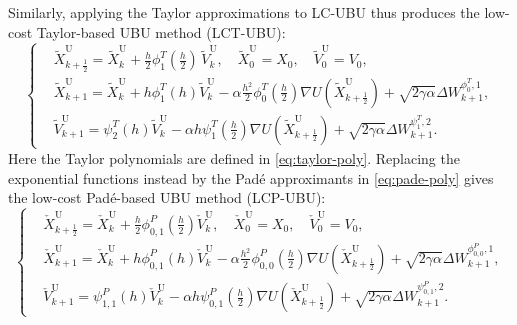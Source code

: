 \documentclass[12pt]{article}
\numberwithin{equation}{section}
\newcommand{\U}{\nabla U}
\begin{document}

Similarly, applying the Taylor approximations 
to LC-UBU thus produces the low-cost
Taylor-based UBU method (LCT-UBU):
\begin{equation}
\label{eq:LCT-UBU}
\left\{
\begin{aligned}
& \widetilde{X}^{\mathrm{U}}_{k+\frac{1}{2}}
=
\widetilde{X}^{\mathrm{U}}_k
+
\tfrac{h}{2} \phi^T_1(\tfrac{h}{2}) \, \widetilde{V}^{\mathrm{U}}_k,
\quad 
\widetilde{X}^{\mathrm{U}}_{0}
=
X_0,
\quad 
\widetilde{V}^{\mathrm{U}}_{0}
=
V_0,
\\
&
\widetilde{X}^{\mathrm{U}}_{k+1}
=
\widetilde{X}^{\mathrm{U}}_k
+
h\phi^T_1(h)\widetilde{V}^{\mathrm{U}}_k
-
\alpha \tfrac{h^2}{2}\phi^T_0(\tfrac{h}{2})
\nabla U(\widetilde{X}^{\mathrm{U}}_{k+\frac{1}{2}})
+
\sqrt{2\gamma\alpha}
\Delta W_{k+1}^{\phi_0^T,1},
\\
&
\widetilde{V}^{\mathrm{U}}_{k+1}
= 
\psi^T_2(h) \widetilde{V}^{\mathrm{U}}_k
-
\alpha h\psi^T_1(\tfrac{h}{2})
\nabla U(\widetilde{X}^{\mathrm{U}}_{k+\frac{1}{2}})
+
\sqrt{2\gamma\alpha}
\Delta W_{k+1}^{\psi_1^T,2}.
\end{aligned}
\right.
\end{equation}
Here the Taylor polynomials are defined in \eqref{eq:taylor-poly}. 
Replacing the exponential functions instead by the Pad\'e
approximants in \eqref{eq:pade-poly} gives the low-cost
Pad\'e-based UBU method (LCP-UBU):
\begin{equation}\label{eq:LCP-UBU}
\left\{
\begin{aligned}
& 
\check{X}^{\mathrm{U}}_{k+\frac{1}{2}}
=
\check{X}^{\mathrm{U}}_k
+
\tfrac{h}{2} \phi^P_{0,1}(\tfrac{h}{2})\check{V}^{\mathrm{U}}_k,
\quad 
\check{X}^{\mathrm{U}}_{0}
=
X_0,
\quad 
\check{V}^{\mathrm{U}}_{0}
=
V_0,
\\
& 
\check{X}^{\mathrm{U}}_{k+1}
=
\check{X}^{\mathrm{U}}_k
+
h\phi^P_{0,1}(h)
\check{V}^{\mathrm{U}}_k
-
\alpha \tfrac{h^2}{2} \phi^P_{0,0}(\tfrac{h}{2})
\U(\check{X}^{\mathrm{U}}_{k+\frac{1}{2}})
+
\sqrt{2\gamma\alpha}
\Delta W_{k+1}^{\phi^P_{0,0},1}, \\
&  
\check{V}^{\mathrm{U}}_{k+1}
= 
\psi^P_{1,1}(h)\check{V}^{\mathrm{U}}_k
-
\alpha h \psi^P_{0,1}(\tfrac{h}{2}) \U(\check{X}^{\mathrm{U}}_{k+\frac{1}{2}})
+
\sqrt{2\gamma\alpha}
\Delta W_{k+1}^{\psi^P_{0,1},2}.
\end{aligned}
\right.
\end{equation}
\end{document}
